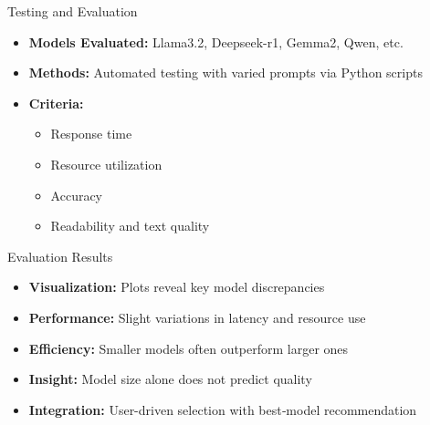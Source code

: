 \documentclass{beamer}
\begin{document}
\begin{frame}{Testing and Evaluation}
  \begin{itemize}
    \item \textbf{Models Evaluated:} Llama3.2, Deepseek-r1, Gemma2, Qwen, etc.
    \item \textbf{Methods:} Automated testing with varied prompts via Python scripts
    \item \textbf{Criteria:}
      \begin{itemize}
        \item Response time
        \item Resource utilization
        \item Accuracy
        \item Readability and text quality
      \end{itemize}
  \end{itemize}
\end{frame}

\begin{frame}{Evaluation Results}
  \begin{itemize}
    \item \textbf{Visualization:} Plots reveal key model discrepancies
    \item \textbf{Performance:} Slight variations in latency and resource use
    \item \textbf{Efficiency:} Smaller models often outperform larger ones
    \item \textbf{Insight:} Model size alone does not predict quality
    \item \textbf{Integration:} User-driven selection with best‑model recommendation
  \end{itemize}
\end{frame}
\end{document}

